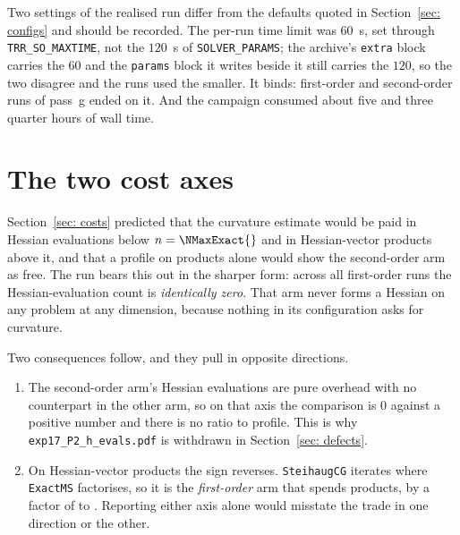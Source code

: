 \documentclass[11pt,a4paper]{article}
\theoremstyle{remark}
\begin{document}
\begin{table}[H]
  \centering
  \caption{Status composition of the \NRuns{} archived runs, both passes pooled.
    \texttt{user} is the pass-g callback of Section~\ref{sec: costs} firing, so it
    counts pass-g runs that reached a first-order point. The last line is the
    subject of Section~\ref{sec: P3}.}
  \label{tab: campaign}
  
\end{table}

Two settings of the realised run differ from the defaults quoted in
Section~\ref{sec: configs} and should be recorded. The per-run time limit was
$60$~s, set through \texttt{TRR\_SO\_MAXTIME}, not the $120$~s of
\texttt{SOLVER\_PARAMS}; the archive's \texttt{extra} block carries the $60$ and
the \texttt{params} block it writes beside it still carries the $120$, so the two
disagree and the runs used the smaller. It binds: \MaxTimeFo{} first-order and
\MaxTimeSo{} second-order runs of pass~g ended on it. And the campaign consumed
about five and three quarter hours of wall time.

\section{The two cost axes}\label{sec: cost axes}

Section~\ref{sec: costs} predicted that the curvature estimate would be paid in
Hessian evaluations below $n = \NMaxExact{}$ and in Hessian-vector products above
it, and that a profile on products alone would show the second-order arm as free.
The run bears this out in the sharper form: across all \NLamFoTotal{} first-order
runs the Hessian-evaluation count is \emph{identically zero}. That arm never forms
a Hessian on any problem at any dimension, because nothing in its configuration
asks for curvature.

Two consequences follow, and they pull in opposite directions.

\begin{enumerate}[leftmargin=1.8em]
  \item The second-order arm's Hessian evaluations are pure overhead with no
    counterpart in the other arm, so on that axis the comparison is $0$ against a
    positive number and there is no ratio to profile. This is why
    \texttt{exp17\_P2\_h\_evals.pdf} is withdrawn in Section~\ref{sec: defects}.
  \item On Hessian-vector products the sign reverses. \texttt{SteihaugCG} iterates
    where \texttt{ExactMS} factorises, so it is the \emph{first-order} arm that
    spends products, by a factor of \PtwoHpMin{} to \PtwoHpMax{}. Reporting either
    axis alone would misstate the trade in one direction or the other.
\end{enumerate}
\end{document}
